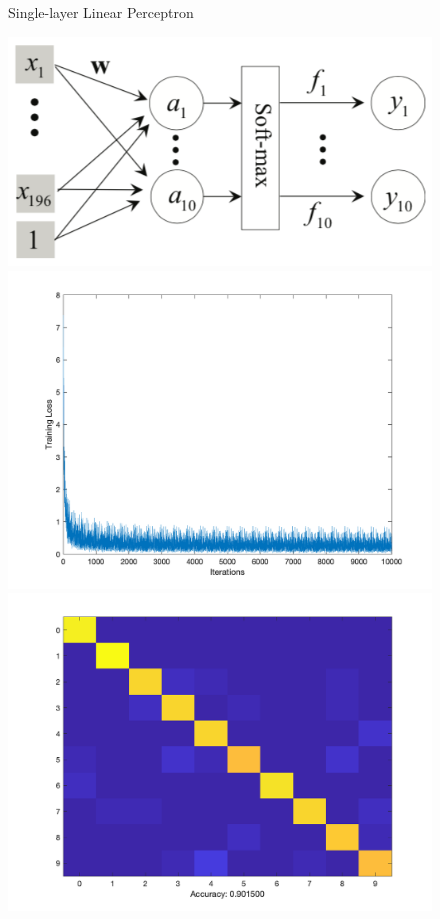 \documentclass[letter, 10pt]{article}
\begin{document}
\begin{figure}[H]
    \endminipage\hfill
    \caption{Single-layer Linear Perceptron}
\end{figure}

\begin{figure}[H]
        \centering
        \includegraphics[width=\textwidth]{HW4/RESULT/SLP.png}
    \endminipage\hfill
        \centering
        \includegraphics[width=1.1\textwidth]{HW4/RESULT/SLP_loss.png}
    \endminipage\hfill
        \centering
        \includegraphics[width=1.1\textwidth]{HW4/RESULT/SLP_CONFUSION.png}

\end{figure}
\end{document}
